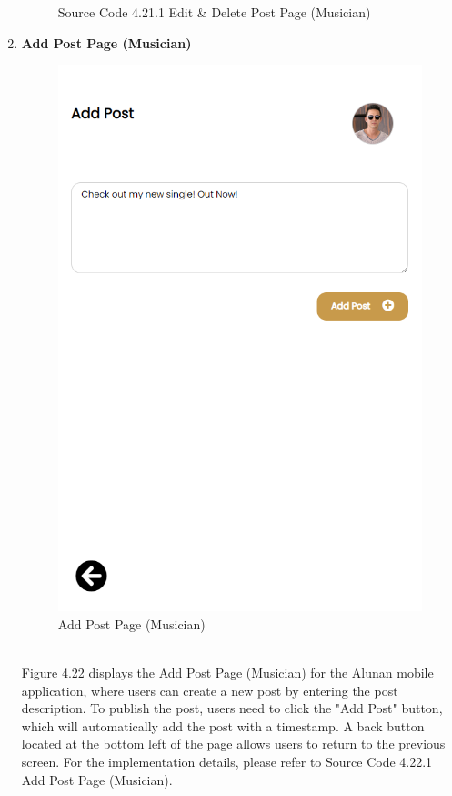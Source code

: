 \begin{enumerate}[1.]
\begin{figure}[h]
        \caption*{Source Code 4.21.1 Edit \& Delete Post Page (Musician)}
        \label{fig:myfig60a}
    \end{figure}
    \clearpage

    \item \textbf{Add Post Page (Musician)}
    \begin{figure}[h]
        \centering
        \includegraphics[width=0.5\linewidth]{mainmatter/images/frontend/ss/Add Post (Musician).png}
        \caption{Add Post Page (Musician)}
        \label{fig:myfig61}
    \end{figure} \\
    Figure 4.22 displays the Add Post Page (Musician) for the Alunan mobile application, where users can create a new post by entering the post description. To publish the post, users need to click the "Add Post" button, which will automatically add the post with a timestamp. A back button located at the bottom left of the page allows users to return to the previous screen. For the implementation details, please refer to Source Code 4.22.1 Add Post Page (Musician).
    \clearpage
    \begin{figure}[h]
        \centering

\end{figure}
\end{enumerate}
